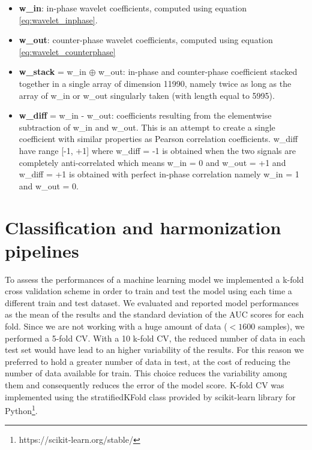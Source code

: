 \documentclass[11pt]{report}
\begin{document}
\begin{itemize}
\item \textbf{w\_in}: in-phase wavelet coefficients, computed using equation \ref{eq:wavelet_inphase}.
\item \textbf{w\_out}: counter-phase wavelet coefficients, computed using equation \ref{eq:wavelet_counterphase}
\item \textbf{w\_stack} = w\_in $\oplus$ w\_out: in-phase and counter-phase coefficient stacked together in a single array of dimension 11990, namely twice as long as the array of w\_in or w\_out singularly taken (with length equal to 5995). 
\item \textbf{w\_diff} = w\_in - w\_out: coefficients resulting from the elementwise subtraction of w\_in and w\_out.
This is an attempt to create a single coefficient with similar properties as Pearson correlation coefficients.
w\_diff have range [-1, +1] where w\_diff = -1 is obtained when the two signals are completely anti-correlated which means w\_in = 0 and w\_out = +1 and w\_diff = +1 is obtained with perfect in-phase correlation namely w\_in = 1 and w\_out = 0. 
\end{itemize}


\section{Classification and harmonization pipelines}


To assess the performances of a machine learning model we implemented a k-fold cross validation scheme in order to train and test the model using each time a different train and test dataset.
We evaluated and reported model performances as the mean of the results and the standard deviation of the AUC scores for each fold.
Since we are not working with a huge amount of data ($< 1600$ samples), we performed a 5-fold CV.
With a 10 k-fold CV, the reduced number of data in each test set would have lead to an higher variability of the results.
For this reason we preferred to hold a greater number of data in test, at the cost of reducing the number of data available for train.
This choice reduces the variability among them and consequently reduces the error of the model score.
K-fold CV was implemented using the stratifiedKFold class provided by scikit-learn library for Python\footnote{https://scikit-learn.org/stable/}.
\end{document}

